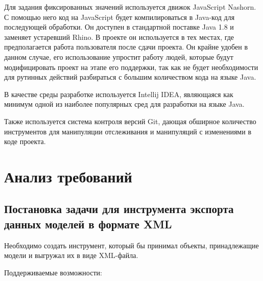 \documentclass[a4paper,12pt]{diplom}
\begin{document}
Для задания фиксированных значений используется движок JavaScript Nashorn. С помощью него код на JavaScript будет компилироваться в Java-код для последующей обработки. Он доступен в стандартной поставке  Java 1.8 и заменяет устаревший Rhino. В проекте он используется в тех местах, где предполагается работа пользователя после сдачи проекта. Он крайне удобен в данном случае, его использование упростит работу людей, которые будут модифицировать проект на этапе его поддержки, так как не будет необходимости для рутинных действий разбираться с большим количеством кода на языке Java.

В качестве среды разработке используется Intellij IDEA, являющаяся как минимум одной из наиболее популярных сред для разработки на языке Java.

Также используется система контроля версий Git, дающая обширное количество инструментов для манипуляции отслеживания и манипуляций с изменениями в коде проекта.

\chapter{Анализ требований}

\section[Постановка задачи]{Постановка задачи для инструмента экспорта данных моделей в формате XML}

Необходимо создать инструмент, который бы принимал объекты, принадлежащие модели и выгружал их в виде XML-файла.  

Поддерживаемые возможности:
\end{document}
